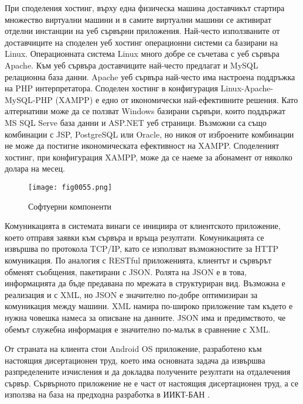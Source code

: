 При споделения хостинг, върху една физическа машина доставчикът стартира множество виртуални машини и в самите виртуални машини се активират отделни инстанции на уеб сървърни приложения. Най-често използваните от доставчиците на споделен уеб хостинг операционни системи са базирани на Linux. Операционната система Linux много добре се съчетава с уеб сървъра Apache. Към уеб сървъра доставчиците най-често предлагат и MySQL релационна база данни. Apache уеб сървъра най-често има настроена поддръжка на PHP интерпретатора. Споделен хостинг в конфигурация Linux-Apache-MySQL-PHP (XAMPP) е едно от икономически най-ефективните решения. Като алтернативи може да се ползват Windows базирани сървъри, които поддържат MS SQL Serve база данни и ASP.NET уеб страници. Възможни са също комбинации с JSP, PostgreSQL или Oracle, но никоя от изброените комбинации не може да постигне икономическата ефективност на XAMPP. Споделеният хостинг, при конфигурация XAMPP, може да се наеме за абонамент от няколко долара на месец. 

\begin{figure}[H]
  \centering
  \texttt{[image: fig0055.png]}
  \caption{Софтуерни компоненти}
\label{fig0055}
\end{figure}

Комуникацията в системата винаги се инициира от клиентското приложение, което отправя заявки към сървъра и връща резултати. Комуникацията се извършва по протокола TCP/IP, като се използват възможностите за HTTP комуникация. По аналогия с RESTful приложенията, клиентът и сървърът обменят съобщения, пакетирани с JSON. Ролята на JSON е в това, информацията да бъде предавана по мрежата в структуриран вид. Възможна е реализация и с XML, но JSON е значително по-добре оптимизиран за комуникация между машини. XML намира по-широко приложение там където е нужна човешка намеса за описване на данните. JSON има и предимството, че обемът служебна информация е значително по-малък в сравнение с XML. 

От страната на клиента стои Android OS приложение, разработено към настоящия дисертационен труд, което има основната задача да извършва разпределените изчисления и да докладва получените резултати на отдалечения сървър. Сървърното приложение не е част от настоящия дисертационен труд, а се използва на база на предходна разработка в ИИКТ-БАН \cite{Balabanov-04}. 

